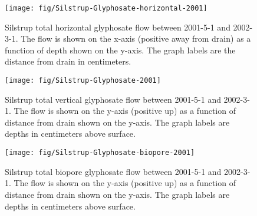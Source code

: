 \begin{figure}[htbp]
  \centering
  \texttt{[image: fig/Silstrup-Glyphosate-horizontal-2001]}
  
  \caption{Silstrup total horizontal glyphosate flow between 2001-5-1 and
    2002-3-1.  The flow is shown on the x-axis (positive away from
    drain) as a function of depth shown on the y-axis.  The graph
    labels are the distance from drain in centimeters.}
  \label{fig:Silstrup-Glyphosate-2001-horizontal}
\end{figure}\FloatBarrier

\begin{figure}[htbp]
  \centering
  \texttt{[image: fig/Silstrup-Glyphosate-2001]}
  
  \caption{Silstrup total vertical glyphosate flow between 2001-5-1 and
    2002-3-1.  The flow is shown on the y-axis (positive up) as a
    function of distance from drain shown on the y-axis.  The graph
    labels are depths in centimeters above surface.}
  \label{fig:Silstrup-Glyphosate-2001-vertical}
\end{figure}\FloatBarrier

\begin{figure}[htbp]
  \centering
  \texttt{[image: fig/Silstrup-Glyphosate-biopore-2001]}
  
  \caption{Silstrup total biopore glyphosate flow between 2001-5-1 and
    2002-3-1.  The flow is shown on the y-axis (positive up) as a
    function of distance from drain shown on the y-axis.  The graph
    labels are depths in centimeters above surface.}
  \label{fig:Silstrup-Glyphosate-biopore-2001}
\end{figure}\FloatBarrier
